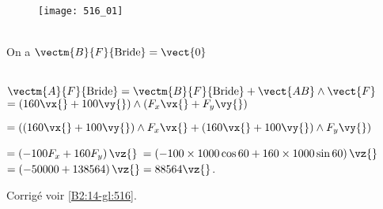 \normaltrue \difficilefalse \tdifficilefalse
\correctiontrue 


\setcounter{question}{0}
\ifcorrection
\else
{}
\fi

\ifprof
\else


\begin{figure}[H]
\centering
\texttt{[image: 516\_01]}
\end{figure}
\fi


\ifprof ~\\
On a $\vectm{B}{F}{\text{Bride}} = \vect{0}$
\else
\fi

\ifprof ~\\
$\vectm{A}{F}{\text{Bride}}=\vectm{B}{F}{\text{Bride}} + \vect{AB}\wedge \vect{F} $ 
$=\left(160 \vx{} + 100 \vy{}\right) \wedge \left(F_x \vx{}+F_y \vy{} \right) $

$= \left(\left(160 \vx{} + 100 \vy{}\right) \wedge  F_x \vx{}+ \left(160 \vx{} + 100 \vy{}\right) \wedge F_y \vy{} \right) $

$= \left( -100 F_x +  160  F_y   \right)\vz{} $
$= \left( -100 \times 1000 \cos 60 +  160   \times 1000 \sin 60 \right)\vz{} $
$= \left( - 50000 +  138 564 \right)\vz{} =  88 564 \vz{} $.
\else
\fi


\ifprof
\else
\begin{flushright}
\footnotesize{Corrigé  voir \ref{B2:14-gl:516}.}
\end{flushright}%
\fi